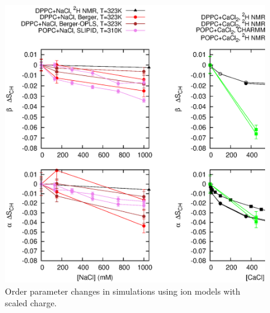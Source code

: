 \documentclass[pre,aps,floatfix,authordate1-4,twocolumn]{revtex4-1}
\begin{document}

\begin{figure}[]
  \centering
  \includegraphics[width=16cm]{../Fig/OrderParameterIONSchangesSCALED.eps} 
  \caption{\label{OPchangesSCALED}
    Order parameter changes in simulations using ion models with scaled charge. 
    }
\end{figure}
\end{document}
